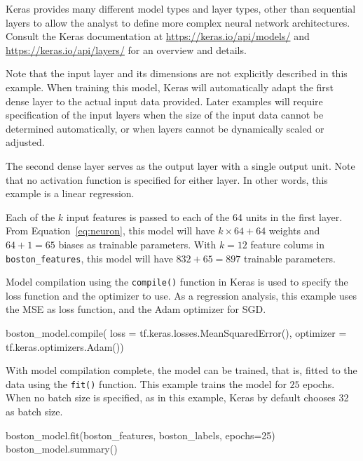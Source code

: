 Keras provides many different model types and layer types, other than sequential layers to allow the analyst to define more complex neural network architectures. Consult the Keras documentation at \url{https://keras.io/api/models/} and \url{https://keras.io/api/layers/} for an overview and details.

Note that the input layer and its dimensions are not explicitly described in this example. When training this model, Keras will automatically adapt the first dense layer to the actual input data provided. Later examples will require specification of the input layers when the size of the input data cannot be determined automatically, or when layers cannot be dynamically scaled or adjusted. 

The second dense layer serves as the output layer with a single output unit. Note that no activation function is specified for either layer. In other words, this example is a linear regression.

Each of the $k$ input features is passed to each of the 64 units in the first layer. From Equation~\ref{eq:neuron}, this model will have $k \times 64 + 64$ weights and $64 + 1 = 65$ biases as trainable parameters. With $k=12$ feature colums in \texttt{boston\_features}, this model will have $832 + 65 = 897$ trainable parameters. 

Model compilation using the \texttt{compile()} function in Keras is used to specify the loss function and the optimizer to use. As a regression analysis, this example uses the MSE as loss function, and the Adam optimizer for SGD.

\begin{samepage}
\begin{pythoncode}
boston_model.compile(
    loss = tf.keras.losses.MeanSquaredError(),
    optimizer = tf.keras.optimizers.Adam())
\end{pythoncode}
\end{samepage}

With model compilation complete, the model can be trained, that is, fitted to the data using the \texttt{fit()} function. This example trains the model for $25$ epochs. When no batch size is specified, as in this example, Keras by default chooses 32 as batch size.

\begin{samepage}
\begin{pythoncode}
boston_model.fit(boston_features, boston_labels, epochs=25)
boston_model.summary()
\end{pythoncode}
\end{samepage}

